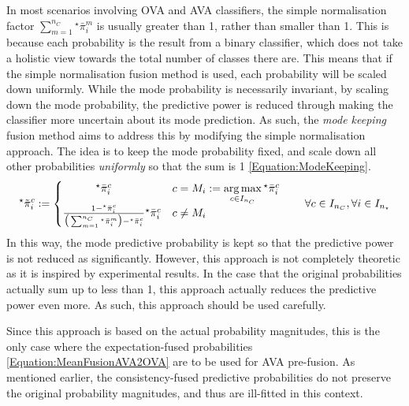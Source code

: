 					In most scenarios involving OVA and AVA classifiers, the simple normalisation factor $\sum_{m = 1}^{n_{C}} {^{\star}}\bar{\pi}^{m}_{i}$ is usually greater than 1, rather than smaller than 1. This is because each probability is the result from a binary classifier, which does not take a holistic view towards the total number of classes there are. This means that if the simple normalisation fusion method is used, each probability will be scaled down uniformly. While the mode probability is necessarily invariant, by scaling down the mode probability, the predictive power is reduced through making the classifier more uncertain about its mode prediction. As such, the \textit{mode keeping} fusion method aims to address this by modifying the simple normalisation approach. The idea is to keep the mode probability fixed, and scale down all other probabilities \textit{uniformly} so that the sum is 1 \eqref{Equation:ModeKeeping}. \begin{equation}
						\begin{aligned}
							{^{\star}}\tilde{\pi}^{c}_{i} := \begin{cases}
								\qquad \quad {^{\star}}\bar{\pi}^{c}_{i} & c = M_{i} :=  \operatorname*{arg\,max}\limits_{c \in I_{n_{C}}} {^{\star}}\bar{\pi}^{c}_{i} \\
								\frac{1 - {^{\star}}\bar{\pi}^{c}_{i}}{\big(\sum_{m = 1}^{n_{C}} {^{\star}}\bar{\pi}^{m}_{i}\big) - {^{\star}}\bar{\pi}^{c}_{i}} {^{\star}}\bar{\pi}^{c}_{i} & c \neq M_{i}
							\end{cases} \qquad \forall c \in I_{n_{C}}, \forall i \in I_{n_{\star}}
						\end{aligned}
					\label{Equation:ModeKeeping}
					\end{equation} In this way, the mode predictive probability is kept so that the predictive power is not reduced as significantly. However, this approach is not completely theoretic as it is inspired by experimental results. In the case that the original probabilities actually sum up to less than 1, this approach actually reduces the predictive power even more. As such, this approach should be used carefully.
					
					Since this approach is based on the actual probability magnitudes, this is the only case where the expectation-fused probabilities \eqref{Equation:MeanFusionAVA2OVA} are to be used for AVA pre-fusion. As mentioned earlier, the consistency-fused predictive probabilities do not preserve the original probability magnitudes, and thus are ill-fitted in this context.
					
